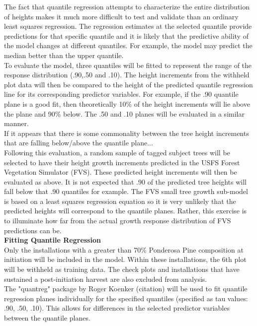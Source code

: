 \documentclass[10pt, letterpaper, fleqn]{article}
\begin{document}
\noindent 
The fact that quantile regression attempts to characterize the entire distribution of heights makes it much more difficult to test and validate than an ordinary least squares regression.  The regression estimates at the selected quantile provide predictions for that specific quantile and it is likely that the predictive ability of the model changes at different quantiles.  For example, the model may predict the median better than the upper quantile. \\[2pt]
\noindent 
To evaluate the model, three quantiles will be fitted to represent the range of the response distribution (.90,.50 and .10).  The height increments from the withheld plot data will then be compared to the height of the predicted quantile regression line for its corresponding predictor variables.  For example, if the .90 quantile plane is a good fit, then theoretically 10\% of the height increments will lie above the plane and 90\% below.  The .50 and .10 planes will be evaluated in a similar manner. \\[2pt]
\noindent 
	If it appears that there is some commonality between the tree height increments that are falling below/above the quantile plane...\\[2pt]
\noindent 
Following this evaluation, a random sample of tagged subject trees will be selected to have their height growth increments predicted in the USFS Forest Vegetation Simulator (FVS).  These predicted height increments will then be evaluated as above.  It is not expected that .90 of the predicted tree heights will fall below that .90 quantiles for example. The FVS small tree growth sub-model is based on a least squares regression equation so it is very unlikely that the predicted heights will correspond to the quantile planes.   Rather, this exercise is to illuminate how far from the actual growth response distribution of FVS predictions can be.\\[2pt]
\noindent 
\textbf{Fitting Quantile Regression}\\[1pt]
\noindent 
Only the installations with a greater than 70\% Ponderosa Pine composition at initiation will be included in the model.  Within these installations, the 6th plot will be withheld as training data.  The check plots and installations that have sustained a post-initiation harvest are also excluded from analysis.  \\[2pt]
\noindent 
The "quantreg" package by Roger Koenker (citation) will be used to fit quantile regression planes individually for the specified quantiles (specified as tau values: .90, .50, .10).  This allows for differences in the selected predictor variables between the quantile planes.  \\[2pt]
\end{document}
